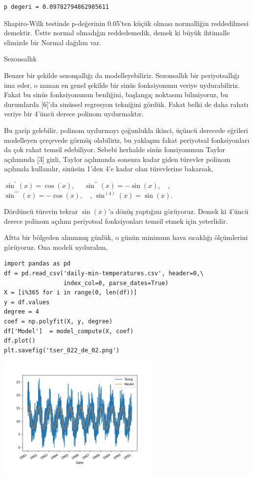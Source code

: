 \documentclass[12pt,fleqn]{article}\usepackage{../../common}
\begin{document}
\begin{verbatim}
p degeri = 0.09782794862985611
\end{verbatim}

Shapiro-Wilk testinde p-değerinin 0.05'ten küçük olması normalliğin reddedilmesi
demektir. Üstte normal olmadığın reddedemedik, demek ki büyük ihtimalle elimizde
bir Normal dağılım var.

Sezonsallık

Benzer bir şekilde sezonşallığı da modelleyebiliriz. Sezonsallık bir
periyotsallığı ima eder, o zaman en genel şekilde bir sinüs fonksiyonunu veriye
uydurabiliriz. Fakat bu sinüs fonksiyonunun benliğini, başlangıç noktasını
bilmiyoruz, bu durumlarda [6]'da sinüssel regresyon tekniğini gördük. Fakat
belki de daha rahatı veriye bir 4'üncü derece polinom uydurmaktır.

Bu garip gelebilir, polinom uydurmayı çoğunlukla ikinci, üçüncü derecede
eğrileri modelleyen çerçevede görmüş olabiliriz, bu yaklaşım fakat periyotsal
fonksiyonları da çok rahat temsil edebiliyor. Sebebi herhalde sinüs fonsiyonunun
Taylor açılımında [3] gizli, Taylor açılımında sonsuza kadar giden türevler
polinom açılımda kullanılır, sinüsün 1'den 4'e kadar olan türevlerine bakarsak,

$\sin^{\prime}(x)=\cos(x),\quad$
$\sin^{\prime\prime}(x)=-\sin(x),\quad$,
$\sin^{\prime\prime\prime}(x)=-\cos(x),\quad$,
$\sin^{(4)}(x)=\sin(x)$.

Dördüncü türevin tekrar $\sin(x)$'a dönüş yaptığını görüyoruz. Demek ki 4'üncü
derece polinom açılımı periyotsal fonksiyonları temsil etmek için yeterlidir.

Altta bir bölgeden alınmmış günlük, o günün minimum hava sıcaklığı ölçümlerini
görüyoruz. Ona modeli uyduralım,

\begin{verbatim}
import pandas as pd
df = pd.read_csv('daily-min-temperatures.csv', header=0,\
                 index_col=0, parse_dates=True)
X = [i%365 for i in range(0, len(df))]
y = df.values
degree = 4
coef = np.polyfit(X, y, degree)
df['Model']  = model_compute(X, coef)
df.plot()
plt.savefig('tser_022_de_02.png')
\end{verbatim}

\includegraphics[height=6cm]{tser_022_de_02.png}
\end{document}
